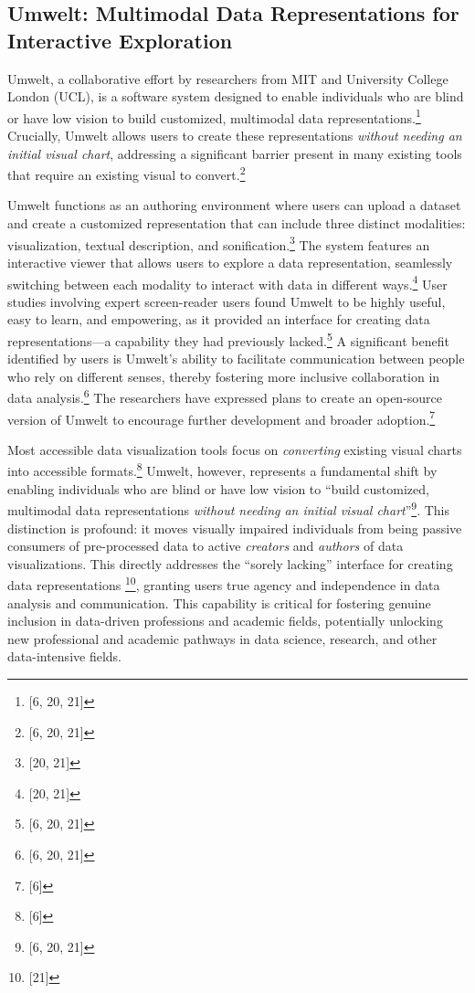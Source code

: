 \subsection{Umwelt: Multimodal Data Representations for Interactive Exploration}
Umwelt, a collaborative effort by researchers from MIT and University College London (UCL), is a software system designed to enable individuals who are blind or have low vision to build customized, multimodal data representations.\footnote{[6, 20, 21]} Crucially, Umwelt allows users to create these representations \textit{without needing an initial visual chart}, addressing a significant barrier present in many existing tools that require an existing visual to convert.\footnote{[6, 20, 21]}

Umwelt functions as an authoring environment where users can upload a dataset and create a customized representation that can include three distinct modalities: visualization, textual description, and sonification.\footnote{[20, 21]} The system features an interactive viewer that allows users to explore a data representation, seamlessly switching between each modality to interact with data in different ways.\footnote{[20, 21]} User studies involving expert screen-reader users found Umwelt to be highly useful, easy to learn, and empowering, as it provided an interface for creating data representations---a capability they had previously lacked.\footnote{[6, 20, 21]} A significant benefit identified by users is Umwelt's ability to facilitate communication between people who rely on different senses, thereby fostering more inclusive collaboration in data analysis.\footnote{[6, 20, 21]} The researchers have expressed plans to create an open-source version of Umwelt to encourage further development and broader adoption.\footnote{[6]}

Most accessible data visualization tools focus on \textit{converting} existing visual charts into accessible formats.\footnote{[6]} Umwelt, however, represents a fundamental shift by enabling individuals who are blind or have low vision to ``build customized, multimodal data representations \textit{without needing an initial visual chart}''\footnote{[6, 20, 21]}. This distinction is profound: it moves visually impaired individuals from being passive consumers of pre-processed data to active \textit{creators} and \textit{authors} of data visualizations. This directly addresses the ``sorely lacking'' interface for creating data representations \footnote{[21]}, granting users true agency and independence in data analysis and communication. This capability is critical for fostering genuine inclusion in data-driven professions and academic fields, potentially unlocking new professional and academic pathways in data science, research, and other data-intensive fields.

